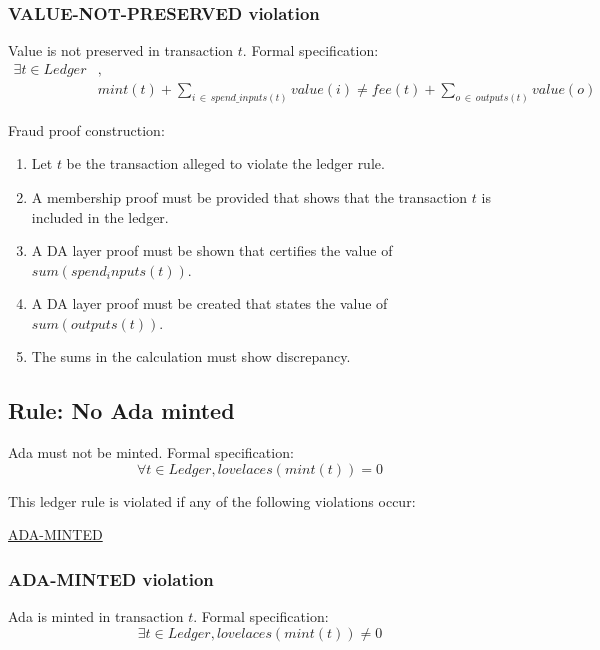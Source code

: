 \documentclass[../midgard.tex]{subfiles}
\begin{document}
\subsubsection{VALUE-NOT-PRESERVED violation}
\label{violation:VALUE-NOT-PRESERVED}
Value is not preserved in transaction $t$.
Formal specification:
\begin{equation*}
  \begin{split}
      \exists t \in Ledger &, \\
      & mint(t) + \sum_{i \, \in \, spend\_inputs(t)} value(i) \neq fee(t) + \sum_{o \, \in \, outputs(t)} value(o)
  \end{split}
  \end{equation*}

Fraud proof construction:
\begin{enumerate}
  \item Let $t$ be the transaction alleged to violate the ledger rule. 
  \item A membership proof must be provided that shows that the transaction $t$ is included in the ledger.
  \item A DA layer proof must be shown that certifies the value of $sum(spend_inputs(t))$.
  \item A DA layer proof must be created that states the value of $sum(outputs(t))$.
  \item The sums in the calculation must show discrepancy.
\end{enumerate}

\subsection{Rule: No Ada minted}
\label{rule:no-ada-minted}
Ada must not be minted.
Formal specification:
\begin{equation*}
    \forall t \in Ledger, lovelaces(mint(t)) = 0
\end{equation*}

This ledger rule is violated if any of the following violations occur:
\begin{itemize-multi}
  \item \hyperref[violation:ADA-MINTED]{ADA-MINTED}
\end{itemize-multi}

\subsubsection{ADA-MINTED violation}
\label{violation:ADA-MINTED}
Ada is minted in transaction $t$.
Formal specification:
\begin{equation*}
  \exists t \in Ledger, lovelaces(mint(t)) \neq 0
\end{equation*}
\end{document}
